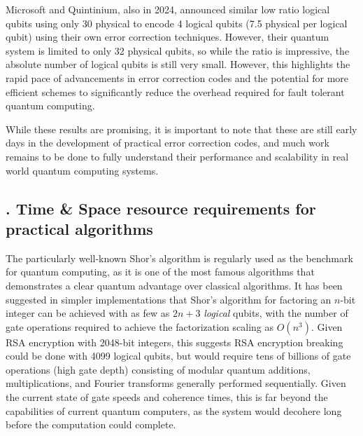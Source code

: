 \documentclass{elbioimp2}
\begin{document}
Microsoft and Quintinium, also in 2024, announced similar low ratio logical qubits using only 30 physical to encode 4 logical qubits (7.5 physical per logical qubit) using their own error correction techniques. However, their quantum system is limited to only 32 physical qubits, so while the ratio is impressive, the absolute number of logical qubits is still very small\cite{paetznick2024demonstrationlogicalqubitsrepeated}. However, this highlights the rapid pace of advancements in error correction codes and the potential for more efficient schemes to significantly reduce the overhead required for fault tolerant quantum computing.

While these results are promising, it is important to note that these are still early days in the development of practical error correction codes, and much work remains to be done to fully understand their performance and scalability in real world quantum computing systems.

\subsection{. Time \& Space resource requirements for practical algorithms}
The particularly well-known Shor’s algorithm is regularly used as the benchmark for quantum computing, as it is one of the most famous algorithms that demonstrates a clear quantum advantage over classical algorithms. It has been suggested in simpler implementations that Shor's algorithm for factoring an $n$-bit integer can be achieved with as few as $2n+3$ \textit{logical} qubits, with the number of gate operations required to achieve the factorization scaling as $O(n^3)$\cite{beauregard2003circuitshorsalgorithmusing}. Given RSA encryption with 2048-bit integers, this suggests RSA encryption breaking could be done with 4099 logical qubits, but would require tens of billions of gate operations (high gate depth) consisting of modular quantum additions, multiplications, and Fourier transforms generally performed sequentially. Given the current state of gate speeds and coherence times, this is far beyond the capabilities of current quantum computers, as the system would decohere long before the computation could complete.
\end{document}
